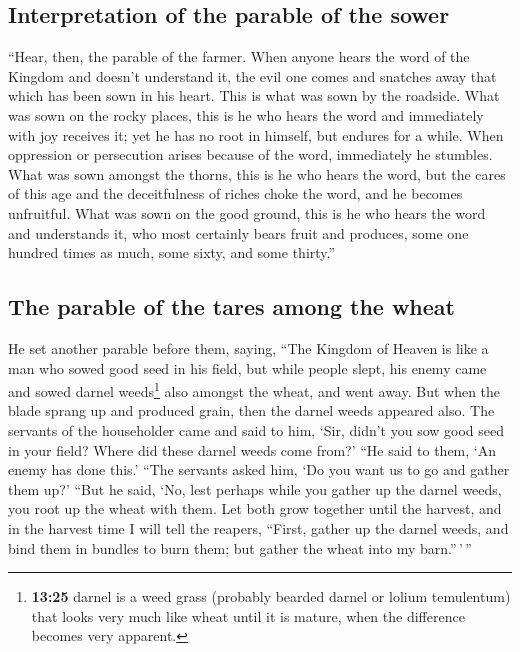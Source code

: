 \hypertarget{interpretation-of-the-parable-of-the-sower}{%
\subsection{Interpretation of the parable of the
sower}\label{interpretation-of-the-parable-of-the-sower}}

 ``Hear, then, the parable of the farmer. 
When anyone hears the word of the Kingdom and doesn't understand it, the
evil one comes and snatches away that which has been sown in his heart.
This is what was sown by the roadside.  What was sown on
the rocky places, this is he who hears the word and immediately with joy
receives it;  yet he has no root in himself, but endures
for a while. When oppression or persecution arises because of the word,
immediately he stumbles.  What was sown amongst the
thorns, this is he who hears the word, but the cares of this age and the
deceitfulness of riches choke the word, and he becomes unfruitful.
 What was sown on the good ground, this is he who hears
the word and understands it, who most certainly bears fruit and
produces, some one hundred times as much, some sixty, and some thirty.''

\hypertarget{the-parable-of-the-tares-among-the-wheat}{%
\subsection{The parable of the tares among the
wheat}\label{the-parable-of-the-tares-among-the-wheat}}

 He set another parable before them, saying, ``The
Kingdom of Heaven is like a man who sowed good seed in his field,
 but while people slept, his enemy came and sowed darnel
weeds\footnote{\textbf{13:25} darnel is a weed grass (probably bearded
  darnel or lolium temulentum) that looks very much like wheat until it
  is mature, when the difference becomes very apparent.} also amongst
the wheat, and went away.  But when the blade sprang up
and produced grain, then the darnel weeds appeared also. 
The servants of the householder came and said to him, `Sir, didn't you
sow good seed in your field? Where did these darnel weeds come from?'
 ``He said to them, `An enemy has done this.' ``The
servants asked him, `Do you want us to go and gather them up?'
 ``But he said, `No, lest perhaps while you gather up the
darnel weeds, you root up the wheat with them.  Let both
grow together until the harvest, and in the harvest time I will tell the
reapers, ``First, gather up the darnel weeds, and bind them in bundles
to burn them; but gather the wheat into my barn.''\,'\,''

